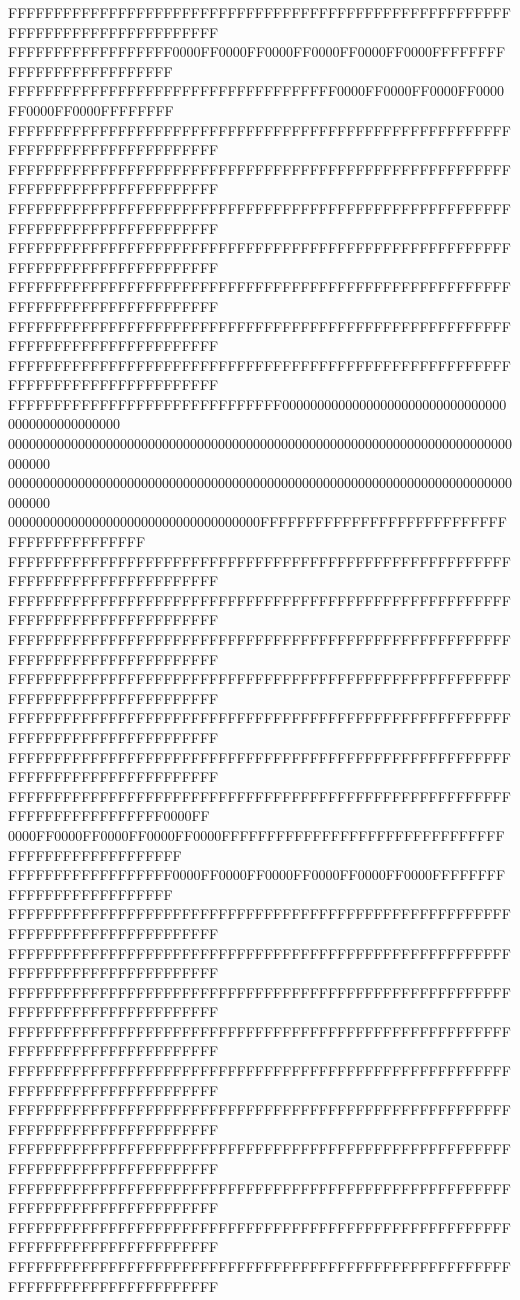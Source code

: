 FFFFFFFFFFFFFFFFFFFFFFFFFFFFFFFFFFFFFFFFFFFFFFFFFFFFFFFFFFFFFFFFFFFFFFFFFFFFFF
FFFFFFFFFFFFFFFFFF0000FF0000FF0000FF0000FF0000FF0000FFFFFFFFFFFFFFFFFFFFFFFFFF
FFFFFFFFFFFFFFFFFFFFFFFFFFFFFFFFFFFF0000FF0000FF0000FF0000FF0000FF0000FFFFFFFF
FFFFFFFFFFFFFFFFFFFFFFFFFFFFFFFFFFFFFFFFFFFFFFFFFFFFFFFFFFFFFFFFFFFFFFFFFFFFFF
FFFFFFFFFFFFFFFFFFFFFFFFFFFFFFFFFFFFFFFFFFFFFFFFFFFFFFFFFFFFFFFFFFFFFFFFFFFFFF
FFFFFFFFFFFFFFFFFFFFFFFFFFFFFFFFFFFFFFFFFFFFFFFFFFFFFFFFFFFFFFFFFFFFFFFFFFFFFF
FFFFFFFFFFFFFFFFFFFFFFFFFFFFFFFFFFFFFFFFFFFFFFFFFFFFFFFFFFFFFFFFFFFFFFFFFFFFFF
FFFFFFFFFFFFFFFFFFFFFFFFFFFFFFFFFFFFFFFFFFFFFFFFFFFFFFFFFFFFFFFFFFFFFFFFFFFFFF
FFFFFFFFFFFFFFFFFFFFFFFFFFFFFFFFFFFFFFFFFFFFFFFFFFFFFFFFFFFFFFFFFFFFFFFFFFFFFF
FFFFFFFFFFFFFFFFFFFFFFFFFFFFFFFFFFFFFFFFFFFFFFFFFFFFFFFFFFFFFFFFFFFFFFFFFFFFFF
FFFFFFFFFFFFFFFFFFFFFFFFFFFFFF000000000000000000000000000000000000000000000000
000000000000000000000000000000000000000000000000000000000000000000000000000000
000000000000000000000000000000000000000000000000000000000000000000000000000000
000000000000000000000000000000000000FFFFFFFFFFFFFFFFFFFFFFFFFFFFFFFFFFFFFFFFFF
FFFFFFFFFFFFFFFFFFFFFFFFFFFFFFFFFFFFFFFFFFFFFFFFFFFFFFFFFFFFFFFFFFFFFFFFFFFFFF
FFFFFFFFFFFFFFFFFFFFFFFFFFFFFFFFFFFFFFFFFFFFFFFFFFFFFFFFFFFFFFFFFFFFFFFFFFFFFF
FFFFFFFFFFFFFFFFFFFFFFFFFFFFFFFFFFFFFFFFFFFFFFFFFFFFFFFFFFFFFFFFFFFFFFFFFFFFFF
FFFFFFFFFFFFFFFFFFFFFFFFFFFFFFFFFFFFFFFFFFFFFFFFFFFFFFFFFFFFFFFFFFFFFFFFFFFFFF
FFFFFFFFFFFFFFFFFFFFFFFFFFFFFFFFFFFFFFFFFFFFFFFFFFFFFFFFFFFFFFFFFFFFFFFFFFFFFF
FFFFFFFFFFFFFFFFFFFFFFFFFFFFFFFFFFFFFFFFFFFFFFFFFFFFFFFFFFFFFFFFFFFFFFFFFFFFFF
FFFFFFFFFFFFFFFFFFFFFFFFFFFFFFFFFFFFFFFFFFFFFFFFFFFFFFFFFFFFFFFFFFFFFFFF0000FF
0000FF0000FF0000FF0000FF0000FFFFFFFFFFFFFFFFFFFFFFFFFFFFFFFFFFFFFFFFFFFFFFFFFF
FFFFFFFFFFFFFFFFFF0000FF0000FF0000FF0000FF0000FF0000FFFFFFFFFFFFFFFFFFFFFFFFFF
FFFFFFFFFFFFFFFFFFFFFFFFFFFFFFFFFFFFFFFFFFFFFFFFFFFFFFFFFFFFFFFFFFFFFFFFFFFFFF
FFFFFFFFFFFFFFFFFFFFFFFFFFFFFFFFFFFFFFFFFFFFFFFFFFFFFFFFFFFFFFFFFFFFFFFFFFFFFF
FFFFFFFFFFFFFFFFFFFFFFFFFFFFFFFFFFFFFFFFFFFFFFFFFFFFFFFFFFFFFFFFFFFFFFFFFFFFFF
FFFFFFFFFFFFFFFFFFFFFFFFFFFFFFFFFFFFFFFFFFFFFFFFFFFFFFFFFFFFFFFFFFFFFFFFFFFFFF
FFFFFFFFFFFFFFFFFFFFFFFFFFFFFFFFFFFFFFFFFFFFFFFFFFFFFFFFFFFFFFFFFFFFFFFFFFFFFF
FFFFFFFFFFFFFFFFFFFFFFFFFFFFFFFFFFFFFFFFFFFFFFFFFFFFFFFFFFFFFFFFFFFFFFFFFFFFFF
FFFFFFFFFFFFFFFFFFFFFFFFFFFFFFFFFFFFFFFFFFFFFFFFFFFFFFFFFFFFFFFFFFFFFFFFFFFFFF
FFFFFFFFFFFFFFFFFFFFFFFFFFFFFFFFFFFFFFFFFFFFFFFFFFFFFFFFFFFFFFFFFFFFFFFFFFFFFF
FFFFFFFFFFFFFFFFFFFFFFFFFFFFFFFFFFFFFFFFFFFFFFFFFFFFFFFFFFFFFFFFFFFFFFFFFFFFFF
FFFFFFFFFFFFFFFFFFFFFFFFFFFFFFFFFFFFFFFFFFFFFFFFFFFFFFFFFFFFFFFFFFFFFFFFFFFFFF
